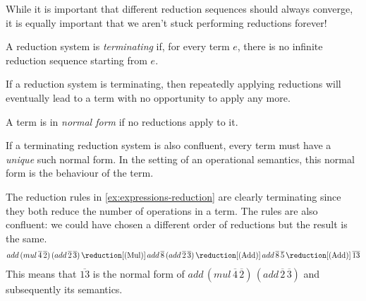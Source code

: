 While it is important that different reduction sequences should always converge,
it is equally important that we aren't stuck performing reductions forever!

\begin{definition}
    A reduction system is \emph{terminating} if, for every term \(e\), there is
    no infinite reduction sequence starting from \(e\).
\end{definition}

If a reduction system is terminating, then repeatedly applying reductions will
eventually lead to a term with no opportunity to apply any more.

\begin{definition}
    A term is in \emph{normal form} if no reductions apply to it.
\end{definition}

If a terminating reduction system is also confluent, every term must have a
\emph{unique} such normal form.
In the setting of an operational semantics, this normal form is the behaviour
of the term.

\begin{example}
    The reduction rules in \cref{ex:expressions-reduction} are clearly
    terminating since they both reduce the number of operations in a term.
    The rules are also confluent: we could have chosen a different order of
    reductions but the result is the same.
    \begin{gather*}
        add \, (mul \, \overline{4} \, \overline{2}) \, (add \, \overline{2} \, \overline{3})
        \,\reduction[(\text{Mul})]\,
        add \, \overline{8} \, (add \, \overline{2} \, \overline{3})
        \,\reduction[(\text{Add})]\,
        add \, \overline{8} \, \overline{5}
        \,\reduction[(\text{Add})]\,
        \overline{13}
    \end{gather*}
    This means that \(\overline{13}\) is the normal form of
    \(add \, (mul \, \overline{4} \, \overline{2}) \, (add \, \overline{2} \, \overline{3})\)
    and subsequently its semantics.
\end{example}